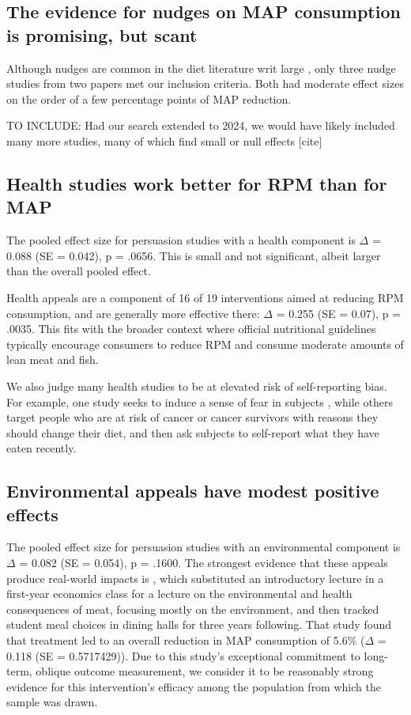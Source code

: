 \documentclass[sn-nature,pdflatex]{sn-jnl}
\begin{document}
\subsection{The evidence for nudges on MAP consumption is promising, but
scant}\label{sec2.5}

Although nudges are common in the diet literature writ large
\citep{olafsson2024, cadario2020, szaszi2018}, only three nudge studies
from two papers \citep[@][]{kanchanachitra2020, andersson2021} met our
inclusion criteria. Both had moderate effect sizes on the order of a few
percentage points of MAP reduction.

TO INCLUDE: Had our search extended to 2024, we would have likely
included many more studies, many of which find small or null effects
{[}cite{]}

\subsection{Health studies work better for RPM than for
MAP}\label{sec2.6}

The pooled effect size for persuasion studies with a health component is
\(\Delta\) = 0.088 (SE = 0.042), p = .0656. This is small and not
significant, albeit larger than the overall pooled effect.

Health appeals are a component of 16 of 19 interventions aimed at
reducing RPM consumption, and are generally more effective there:
\(\Delta\) = 0.255 (SE = 0.07), p = .0035. This fits with the broader
context where official nutritional guidelines typically encourage
consumers to reduce RPM and consume moderate amounts of lean meat and
fish.

We also judge many health studies to be at elevated risk of
self-reporting bias. For example, one study seeks to induce a sense of
fear in subjects \citep{berndsen2005}, while others target people who
are at risk of cancer \citep{hatami2018} or cancer survivors
\citep{james2015, lee2018} with reasons they should change their diet,
and then ask subjects to self-report what they have eaten recently.

\subsection{Environmental appeals have modest positive
effects}\label{sec2.7}

The pooled effect size for persuasion studies with an environmental
component is \(\Delta\) = 0.082 (SE = 0.054), p = .1600. The strongest
evidence that these appeals produce real-world impacts is
\citep{jalil2023}, which substituted an introductory lecture in a
first-year economics class for a lecture on the environmental and health
consequences of meat, focusing mostly on the environment, and then
tracked student meal choices in dining halls for three years following.
That study found that treatment led to an overall reduction in MAP
consumption of 5.6\% (\(\Delta\) = 0.118 (SE = 0.5717429)). Due to this
study's exceptional commitment to long-term, oblique outcome
measurement, we consider it to be reasonably strong evidence for this
intervention's efficacy among the population from which the sample was
drawn.
\end{document}
